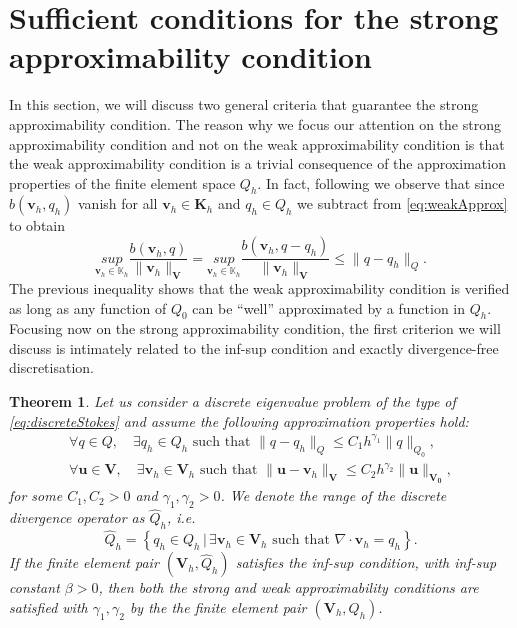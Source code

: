 \documentclass[USenglish]{article}
\theoremstyle{dgthm}
\newtheorem{theorem}{Theorem}
\theoremstyle{dgdef}
\let\vec\bm
\newcommand\norm[1]{\lVert#1\rVert}
\begin{document}
\section{Sufficient conditions for the strong approximability condition}
In this section, we will discuss two general criteria that guarantee the strong approximability condition.
The reason why we focus our attention on the strong approximability condition and not on the weak approximability condition is that the weak approximability condition is a trivial consequence of the approximation properties of the finite element space $Q_h$.
In fact, following \cite{BBG} we observe that since $b(\vec{v}_h,q_h)$ vanish for all $\vec{v}_h\in \vec{K}_h$ and $q_h\in Q_h$ we subtract from \eqref{eq:weakApprox} to obtain
\begin{equation}
  \underset{\vec{v}_h\in \mathbb{K}_h}{sup} \frac{b(\vec{v}_h, q)}{\norm{\vec{v}_h}_{\vec{V}}}= \underset{\vec{v}_h\in \mathbb{K}_h}{sup} \frac{b(\vec{v}_h, q-q_h)}{\norm{\vec{v}_h}_{\vec{V}}}\leq \norm{q-q_h}_{Q}.
\end{equation}
The previous inequality shows that the weak approximability condition is verified as long as any function of $Q_0$ can be ``well'' approximated by a function in $Q_h$.
Focusing now on the strong approximability condition, the first criterion we will discuss is intimately related to the inf-sup condition and exactly divergence-free discretisation.
\begin{theorem}
  \label{thm:strongApproxInfSup}
  Let us consider a discrete eigenvalue problem of the type of \eqref{eq:discreteStokes} and assume the following approximation properties hold:
  \begin{align}
    \forall q\in Q, \quad \exists q_h\in Q_h \text{ such that } \norm{q-q_h}_{Q}\leq C_1 h^{\gamma_1}\norm{q}_{Q_0},\\
    \forall \vec{u}\in \vec{V}, \quad \exists \vec{v}_h\in \vec{V}_h \text{ such that } \norm{\vec{u}-\vec{v}_h}_{\vec{V}}\leq C_2 h^{\gamma_2}\norm{\vec{u}}_{\vec{V_0}},
  \end{align}
  for some $C_1,C_2>0$ and $\gamma_1,\gamma_2>0$.
  We denote the range of the discrete divergence operator as $\hat{Q}_h$, i.e.
  \begin{equation}
    \hat{Q}_h = \left\{q_h\in Q_h\,|\, \exists \vec{v}_h\in \vec{V}_h \text{ such that } \nabla\cdot \vec{v}_h=q_h\right\}.
  \end{equation}
  If the finite element pair $(\vec{V}_h,\hat{Q}_h)$ satisfies the inf-sup condition, with inf-sup constant $\beta>0$, then both the strong and weak approximability conditions are satisfied with $\gamma_1,\gamma_2$ by the the finite element pair $(\vec{V}_h,Q_h)$.
\end{theorem}
\end{document}
